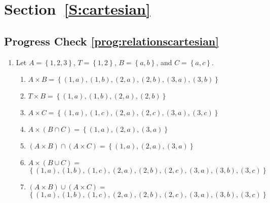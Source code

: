 \section*{Section~\ref{S:cartesian}}
\subsection*{Progress Check \ref{prog:relationscartesian}}
\begin{enumerate}
\item Let  $A = \left\{ {1, 2, 3} \right\}$, $T = \left\{ {1, 2} \right\}$, $B = \left\{ {a, b} \right\}$, and  $C = \left\{ {a, c} \right\}$.

\begin{enumerate}
\item $A \times B = \left\{ {\left( {1, a} \right), \left( {1, b} \right), \left( {2, a} \right), \left( {2, b} \right), \left( {3, a} \right), \left( {3, b} \right)} \right\}$

\item $T \times B = \left\{ {\left( {1, a} \right), \left( {1, b} \right), \left( {2, a} \right), \left( {2, b} \right)} \right\}$

\item $A \times C = \left\{ {\left( {1, a} \right), \left( {1, c} \right), \left( {2, a} \right), \left( {2, c} \right), \left( {3, a} \right), \left( {3, c} \right)} \right\}$

\item $A \times \left( {B \cap C} \right) = \left\{ {\left( {1, a} \right), \left( {2, a} \right), \left( {3, a} \right)} \right\}$

\item $\left( {A \times B} \right) \cap \left( {A \times C} \right) = \left\{ {\left( {1, a} \right), \left( {2, a} \right), \left( {3, a} \right)} \right\}$

\item $A \times \left( {B \cup C} \right) = $ \\
$\left\{ {\left( {1, a} \right), \left( {1, b} \right), \left( {1, c} \right), \left( {2, a} \right), \left( {2, b} \right), \left( {2, c} \right), \left( {3, a} \right), \left( {3, b} \right), \left( {3, c} \right)} \right\}$

\item $\left( {A \times B} \right) \cup \left( {A \times C} \right) = $ \\
$\left\{ {\left( {1, a} \right), \left( {1, b} \right), \left( {1, c} \right), \left( {2, a} \right), \left( {2, b} \right), \left( {2, c} \right), \left( {3, a} \right), \left( {3, b} \right), \left( {3, c} \right)} \right\}$


\end{enumerate}
\end{enumerate}
